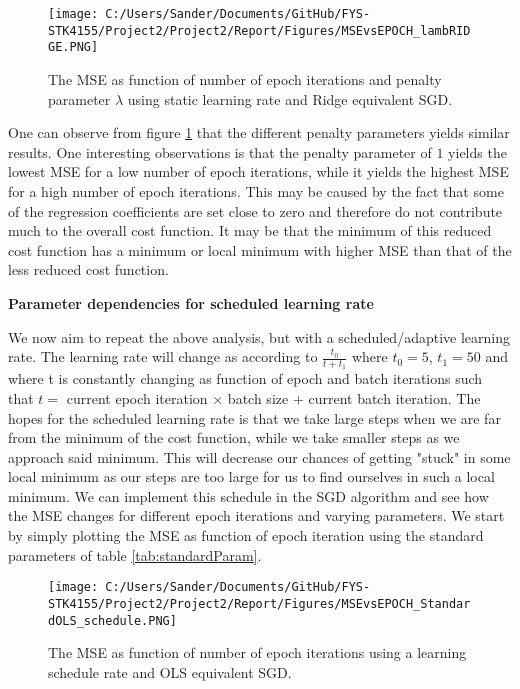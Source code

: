 \documentclass[12pt,a4paper]{article}
\begin{document}
\begin{figure}[H]
\centering
\texttt{[image: C:/Users/Sander/Documents/GitHub/FYS-STK4155/Project2/Project2/Report/Figures/MSEvsEPOCH\_lambRIDGE.PNG]}
\caption{\label{fig:MSEvsEPOCHlambRIDGE} The MSE as function of number of epoch iterations and penalty parameter $\lambda$ using static learning rate and Ridge equivalent SGD.}
\end{figure}

\noindent One can observe from figure \ref{fig:MSEvsEPOCHlambRIDGE} that the different penalty parameters yields similar results. One interesting observations is that the penalty parameter of $1$ yields the lowest MSE for a low number of epoch iterations, while it yields the highest MSE for a high number of epoch iterations. This may be caused by the fact that some of the regression coefficients are set close to zero and therefore do not contribute much to the overall cost function. It may be that the minimum of this reduced cost function has a minimum or local minimum with higher MSE than that of the less reduced cost function.

\begin{center}
\large{\textbf{Parameter dependencies for scheduled learning rate}}
\end{center}

\noindent We now aim to repeat the above analysis, but with a scheduled/adaptive learning rate. The learning rate will change as according to $\frac{t_0}{t+t_1}$ where $t_0 = 5$, $t_1 = 50$ and where t is constantly changing as function of epoch and batch iterations such that $t = $ current epoch iteration $\times$ batch size $+$ current batch iteration. The hopes for the scheduled learning rate is that we take large steps when we are far from the minimum of the cost function, while we take smaller steps as we approach said minimum. This will decrease our chances of getting "stuck" in some local minimum as our steps are too large for us to find ourselves in such a local minimum. We can implement this schedule in the SGD algorithm and see how the MSE changes for different epoch iterations and varying parameters. We start by simply plotting the MSE as function of epoch iteration using the standard parameters of table \ref{tab:standardParam}.

\begin{figure}[H]
\centering
\texttt{[image: C:/Users/Sander/Documents/GitHub/FYS-STK4155/Project2/Project2/Report/Figures/MSEvsEPOCH\_StandardOLS\_schedule.PNG]}
\caption{\label{fig:MSEvsEPOCHstandard_sch} The MSE as function of number of epoch iterations using a learning schedule rate and OLS equivalent SGD.}
\end{figure}
\end{document}
